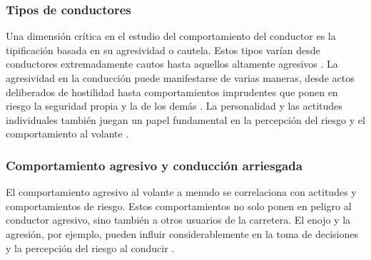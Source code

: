 \subsubsection{Tipos de conductores}
Una dimensión crítica en el estudio del comportamiento del conductor es la tipificación basada en su agresividad o cautela. Estos tipos varían desde conductores extremadamente cautos hasta aquellos altamente agresivos \cite{james2000}. La agresividad en la conducción puede manifestarse de varias maneras, desde actos deliberados de hostilidad hasta comportamientos imprudentes que ponen en riesgo la seguridad propia y la de los demás \cite{dula2003}. La personalidad y las actitudes individuales también juegan un papel fundamental en la percepción del riesgo y el comportamiento al volante \cite{ulleberg2003}.

\subsubsection{Comportamiento agresivo y conducción arriesgada}
El comportamiento agresivo al volante a menudo se correlaciona con actitudes y comportamientos de riesgo. Estos comportamientos no solo ponen en peligro al conductor agresivo, sino también a otros usuarios de la carretera. El enojo y la agresión, por ejemplo, pueden influir considerablemente en la toma de decisiones y la percepción del riesgo al conducir \cite{deffenbacher2003}.
